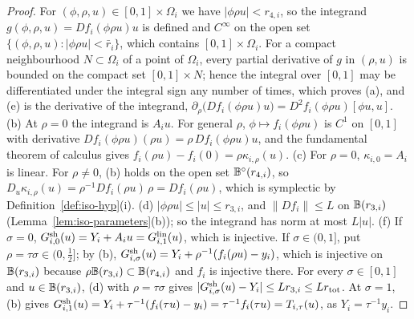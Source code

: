 \begin{proof}
For $(\phi,\rho,u)\in[0,1]\times\Omega_i$ we have $|\phi\rho u|<r_{4,i}$, so the integrand $g(\phi,\rho,u)=Df_i(\phi\rho u)u$ is
defined and $C^\infty$ on the open set $\{(\phi,\rho,u):|\phi\rho u|<\bar r_i\}$, which contains $[0,1]\times\Omega_i$. For a
compact neighbourhood $N\subset\Omega_i$ of a point of $\Omega_i$, every partial derivative of $g$ in $(\rho,u)$ is bounded on
the compact set $[0,1]\times N$; hence the integral over $[0,1]$ may be differentiated under the integral sign any number of
times, which proves (a), and (e) is the derivative of the integrand,
$\partial_\rho\big(Df_i(\phi\rho u)u\big)=D^2f_i(\phi\rho u)[\phi u,u]$.
(b) At $\rho=0$ the integrand is $A_iu$. For general $\rho$, $\phi\mapsto f_i(\phi\rho u)$ is $C^1$ on $[0,1]$ with derivative
$Df_i(\phi\rho u)(\rho u)=\rho\,Df_i(\phi\rho u)u$, and the fundamental theorem of calculus gives
$f_i(\rho u)-f_i(0)=\rho\kappa_{i,\rho}(u)$.
(c) For $\rho=0$, $\kappa_{i,0}=A_i$ is linear. For $\rho\ne0$, (b) holds on the open set $\mathbb{B}^\circ(r_{4,i})$, so
$D_u\kappa_{i,\rho}(u)=\rho^{-1}Df_i(\rho u)\,\rho=Df_i(\rho u)$, which is symplectic by Definition~\ref{def:iso-hyp}(i).
(d) $|\phi\rho u|\le|u|\le r_{3,i}$, and $\|Df_i\|\le L$ on $\mathbb{B}(r_{3,i})$ (Lemma~\ref{lem:iso-parameters}(b)); so the integrand
has norm at most $L|u|$.
(f) If $\sigma=0$, $G^{\rm sh}_{i,0}(u)=Y_i+A_iu=G^{\rm lin}_{i,1}(u)$, which is injective. If $\sigma\in(0,1]$, put
$\rho=\tau\sigma\in(0,\frac12]$; by (b), $G^{\rm sh}_{i,\sigma}(u)=Y_i+\rho^{-1}(f_i(\rho u)-y_i)$, which is injective on
$\mathbb{B}(r_{3,i})$ because $\rho\mathbb{B}(r_{3,i})\subset\mathbb{B}(r_{4,i})$ and $f_i$ is injective there. For every $\sigma\in[0,1]$ and
$u\in\mathbb{B}(r_{3,i})$, (d) with $\rho=\tau\sigma$ gives $|G^{\rm sh}_{i,\sigma}(u)-Y_i|\le Lr_{3,i}\le Lr_{\rm tot}$. At $\sigma=1$, (b) gives
$G^{\rm sh}_{i,1}(u)=Y_i+\tau^{-1}(f_i(\tau u)-y_i)=\tau^{-1}f_i(\tau u)=T_{i,\tau}(u)$, as $Y_i=\tau^{-1}y_i$.
\end{proof}


